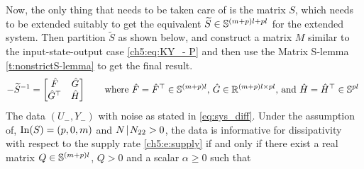 Now, the only thing that needs to be taken care of is the matrix $S$, which needs to be extended suitably to get the equivalent $\widetilde{S}\in\S{(m+p)l + pl}$ for the extended system. Then partition $\widetilde{S}$ as shown below, and construct a matrix $M$ similar to the input-state-output case \eqref{ch5:eq:KY_- P} and then use the Matrix S-lemma \ref{t:nonstrictS-lemma} to get the final result.
\begin{equation} \label{ch5:eq:partition of Sinv}
-\widetilde{S}^{-1} = \begin{bmatrix}
\hatF&\hatG\\
\hatG^\top  &\hatH
\end{bmatrix}\qquad\text{where $\hatF=\hatF^\top \in\S{(m+p)l}$, $\hatG\in\R^{(m+p)l\times pl}$, and $\hatH=\hatH^\top \in\S{pl}$ }
\end{equation}
 \label{ch5:t:noise 1}
The data $(U_-,Y_-)$ with noise as stated in \ref{eq:sys_diff}. Under the assumption of, $\In(S) = (p,0,m)$ and $N \schur N_{22} >0$,
the data is informative for dissipativity with respect to the supply rate \eqref{ch5:e:supply} if and only if there exist a real matrix $Q \in \S{(m+p)l}$, $Q >0$ and a scalar $\alpha\geq 0$ such that 
